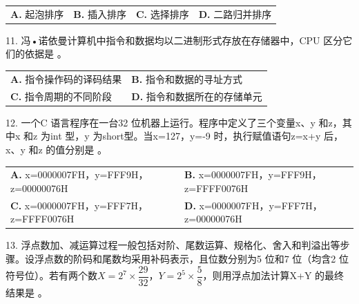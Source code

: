 \documentclass[UTF8,11pt]{ctexart}
\begin{document}
\begin{center}\begin{tabular}{>{\raggedright\arraybackslash}p{\dimexpr(\linewidth-8\tabcolsep)/4\relax}>{\raggedright\arraybackslash}p{\dimexpr(\linewidth-8\tabcolsep)/4\relax}>{\raggedright\arraybackslash}p{\dimexpr(\linewidth-8\tabcolsep)/4\relax}>{\raggedright\arraybackslash}p{\dimexpr(\linewidth-8\tabcolsep)/4\relax}}
\textbf{A.} 起泡排序 & \textbf{B.} 插入排序 & \textbf{C.} 选择排序 & \textbf{D.} 二路归并排序\\[.35em]\end{tabular}\end{center}

11. 冯•诺依曼计算机中指令和数据均以二进制形式存放在存储器中，CPU 区分它们的依据是 。


\begin{center}\begin{tabular}{>{\raggedright\arraybackslash}p{\dimexpr(\linewidth-4\tabcolsep)/2\relax}>{\raggedright\arraybackslash}p{\dimexpr(\linewidth-4\tabcolsep)/2\relax}}
\textbf{A.} 指令操作码的译码结果 & \textbf{B.} 指令和数据的寻址方式\\[.35em]
\textbf{C.} 指令周期的不同阶段 & \textbf{D.} 指令和数据所在的存储单元\\[.35em]\end{tabular}\end{center}

12. 一个C 语言程序在一台32 位机器上运行。程序中定义了三个变量x、y 和z，其中x 和z 为int 型，y 为short型。当x=127，y=-9 时，执行赋值语句z=x+y 后，x、y 和z 的值分别是 。


\begin{center}\begin{tabular}{>{\raggedright\arraybackslash}p{\dimexpr(\linewidth-4\tabcolsep)/2\relax}>{\raggedright\arraybackslash}p{\dimexpr(\linewidth-4\tabcolsep)/2\relax}}
\textbf{A.} x=0000007FH，y=FFF9H，z=00000076H & \textbf{B.} x=0000007FH，y=FFF9H，z=FFFF0076H\\[.35em]
\textbf{C.} x=0000007FH，y=FFF7H，z=FFFF0076H & \textbf{D.} x=0000007FH，y=FFF7H，z=00000076H\\[.35em]\end{tabular}\end{center}

13. 浮点数加、减运算过程一般包括对阶、尾数运算、规格化、舍入和判溢出等步骤。设浮点数的阶码和尾数均采用补码表示，且位数分别为5 位和7 位（均含2 位符号位）。若有两个数\(\displaystyle X=2^7\times\dfrac{\displaystyle 29}{\displaystyle 32}\)，\(\displaystyle Y=2^5\times\dfrac{\displaystyle 5}{\displaystyle 8}\)，则用浮点加法计算X+Y 的最终结果是 。
\end{document}
